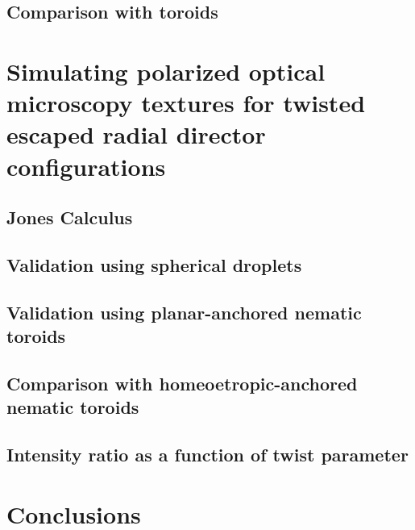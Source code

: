 \subsection{Comparison with toroids}

\section{Simulating polarized optical microscopy textures for twisted escaped radial director configurations}
\subsection{Jones Calculus}
\subsection{Validation using spherical droplets}
\subsection{Validation using planar-anchored nematic toroids}
\subsection{Comparison with homeoetropic-anchored nematic toroids}
\subsection{Intensity ratio as a function of twist parameter}

\section{Conclusions}
